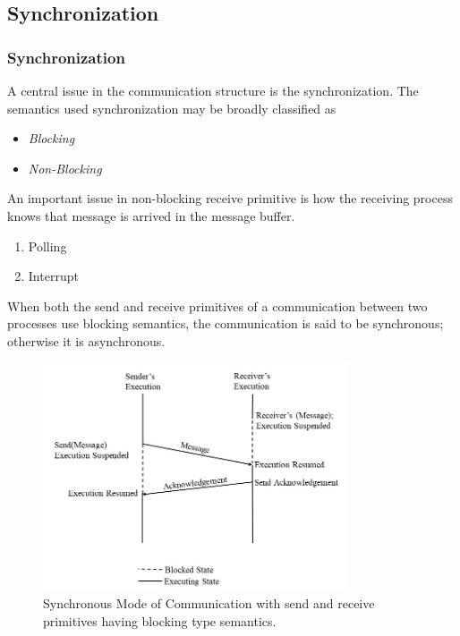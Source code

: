 \documentclass{beamer}
\begin{document}
\subsection{Synchronization}
\begin{frame}[allowframebreaks]
	\frametitle{Synchronization}
	A central issue in the communication structure is the synchronization. The semantics
	used synchronization may be broadly classified as
	\begin{itemize}
		\item \textit{Blocking}
		\item \textit{Non-Blocking}
	\end{itemize}
	An important issue in non-blocking receive primitive is how the receiving process knows that message is arrived in the message buffer.
	\begin{enumerate}
		\item Polling
		\item Interrupt
	\end{enumerate}
	When both the send and receive primitives of a communication between two processes use
	blocking semantics, the communication is said to be synchronous; otherwise it is
	asynchronous.
	
	\framebreak
	\begin{figure}
		\centering
		\includegraphics[width=9cm]{synchronousMode.jpg}
		\caption{Synchronous Mode of Communication with send and receive primitives having
		blocking type semantics.}
	\end{figure}
\end{frame}
\end{document}
